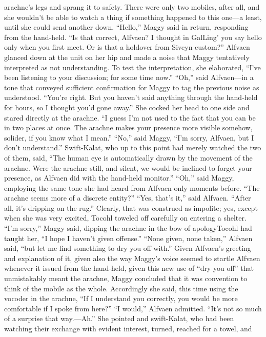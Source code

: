 \documentclass[9pt]{article}
\begin{document}
arachne’s legs and sprang it to safety. There were only two mobiles, after all, and she wouldn’t be able to
watch a thing if something happened to this one—a least, until she could send another down.
“Hello,” Maggy said in return, responding from the hand-held. “Is that correct, Alfvaen? I thought in
GalLing’ you say hello only when you first meet. Or is that a holdover from Siveyn custom?”
Alfvaen glanced down at the unit on her hip and made a noise that Maggy tentatively interpreted as
not understanding. To test the interpretation, she elaborated, “I’ve been listening to your discussion; for
some time now.”
“Oh,” said Alfvaen—in a tone that conveyed sufficient confirmation for Maggy to tag the previous
noise as understood. “You’re right. But you haven’t said anything through the hand-held for hours, so I
thought you’d gone away.” She cocked her head to one side and stared directly at the arachne. “I guess
I’m not used to the fact that you can be in two places at once. The arachne makes your presence more
visible somehow, solider, if you know what I mean.”
“No,” said Maggy, “I’m sorry, Alfvaen, but I don’t understand.”
Swift-Kalat, who up to this point had merely watched the two of them, said, “The human eye is
automatically drawn by the movement of the arachne. Were the arachne still, and silent, we would be
inclined to forget your presence, as Alfvaen did with the hand-held monitor.”
“Oh,” said Maggy, employing the same tone she had heard from Alfvaen only moments before. “The
arachne seems more of a discrete entity?”
“Yes, that’s it,” said Alfvaen. “After all, it’s dripping on the rug.”
Clearly, that was construed as impolite; yes, except when she was very excited, Tocohl toweled off
carefully on entering a shelter. “I’m sorry,” Maggy said, dipping the arachne in the bow of apologyTocohl had taught her, “I hope I haven’t given offense.”
“None given, none taken,” Alfvaen said, “but let me find something to dry you off with.”
Given Alfvaen’s greeting and explanation of it, given also the way Maggy’s voice seemed to startle
Alfvaen whenever it issued from the hand-held, given this new use of “dry you off” that unmistakably
meant the arachne, Maggy concluded that it was convention to think of the mobile as the whole.
Accordingly she said, this time using the vocoder in the arachne, “If I understand you correctly, you
would be more comfortable if I spoke from here?”
“I would,” Alfvaen admitted. “It’s not so much of a surprise that way.—Ah.” She pointed and
swift-Kalat, who had been watching their exchange with evident interest, turned, reached for a towel, and
\end{document}

